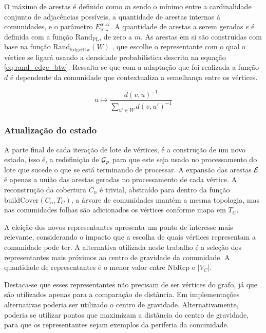 \documentclass[notes.tex]{subfiles}
\begin{document}
O máximo de arestas é definido como $m$ sendo o mínimo entre a cardinalidade conjunto de adjacências possíveis, a quantidade de arestas internas á comunidades, e o parâmetro $E_\text{btw}^\text{max}$.
A quantidade de arestas a serem geradas $e$ é  definida com a função $\text{Rand}_\text{PL}$, de zero a $m$.
As arestas em si são construídas com base na função $\text{Rand}_\text{EdgeBtw}(W)$ \cite{largeron2015generating}, que escolhe o representante com o qual o vértice se ligará usando a densidade probabilística descrita na equação \ref{eq:rand_edge_btw}.
Ressalta-se que com a adaptação que foi realizada a função $d$ é dependente da comunidade que contextualiza a semelhança entre os vértices.

\begin{equation}\label{eq:rand_edge_btw}
    u \mapsto \frac{d(v, u)^{-1}}{\displaystyle\sum_{u' \in W}d(v, u')^{-1}}
\end{equation}

\subsubsection{Atualização do estado}

A parte final de cada iteração de lote de vértices, é a construção de um novo estado, isso é, a redefinição de $\operatorname{\mathcal{G}}_p$ para que este seja usado no processamento do lote que sucede o que se está terminando de processar.
A expansão das arestas  $\operatorname{\mathcal{E}}$ é apenas a união das arestas geradas no processamento de cada vértice.
A reconstrução da cobertura  $C_n$ é trivial, abstraído para dentro da função $\text{buildCover}(C_n, T_C)$, a árvore de comunidades mantém a mesma topologia, mas nas comunidades folhas são adicionados os vértices conforme mapa em $T_C$. 

A eleição dos novos representantes apresenta um ponto de interesse mais relevante, considerando o impacto que a escolha de quais vértices representam a comunidade pode ter.
A alternativa utilizada neste trabalho é a seleção dos representantes mais próximos ao centro de gravidade da comunidade.
A quantidade de representantes é o menor valor entre $\text{NbRep}$ e $|V_C|$.

Destaca-se que esses representantes não precisam de ser vértices do grafo, já que são utilizados apenas para a comparação de distância.
Em implementações alternativas poderia ser utilizado o centro de gravidade.
Alternativamente, poderia se utilizar pontos que maximizam a distância do centro de gravidade, para que os representantes sejam exemplos da periferia da comunidade.
\end{document}
